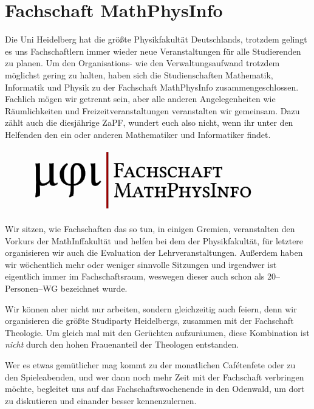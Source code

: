 
\section{Fachschaft MathPhysInfo}

Die Uni Heidelberg hat die größte Physikfakultät Deutschlands, trotzdem gelingt es uns Fachschaftlern immer wieder neue Veranstaltungen für alle Studierenden zu planen. Um den Organisations- wie den Verwaltungsaufwand trotzdem möglichst gering zu halten, haben sich die Studienschaften Mathematik, Informatik und Physik zu der Fachschaft MathPhysInfo zusammengeschlossen. Fachlich mögen wir getrennt sein, aber alle anderen Angelegenheiten wie Räumlichkeiten und Freizeitveranstaltungen veranstalten wir gemeinsam. Dazu zählt auch die diesjährige ZaPF, wundert euch also nicht, wenn ihr unter den Helfenden den ein oder anderen Mathematiker und Informatiker findet.
\begin{figure}
\includegraphics[width=\linewidth]{media/mathphysinfologo}
\vspace*{-20pt}
\end{figure}
Wir sitzen, wie Fachschaften das so tun, in einigen Gremien, veranstalten den Vorkurs der MathInffakultät und helfen bei dem der Physikfakultät, für letztere organisieren wir auch die Evaluation der Lehrveranstaltungen. Außerdem haben wir wöchentlich mehr oder weniger sinnvolle Sitzungen und irgendwer ist eigentlich immer im Fachschaftsraum, weswegen dieser auch schon als 20--Personen--WG bezeichnet wurde.

Wir können aber nicht nur arbeiten, sondern gleichzeitig auch feiern, denn wir organisieren die größte Studiparty Heidelbergs, zusammen mit der Fachschaft Theologie. Um gleich mal mit den Gerüchten aufzuräumen, diese Kombination ist \textit{nicht} durch den hohen Frauenanteil der Theologen entstanden.

Wer es etwas gemütlicher mag kommt zu der monatlichen Cafétenfete oder zu den Spieleabenden, und wer dann noch mehr Zeit mit der Fachschaft verbringen möchte, begleitet uns auf das Fachschaftswochenende in den Odenwald, um dort zu diskutieren und einander besser kennenzulernen.

